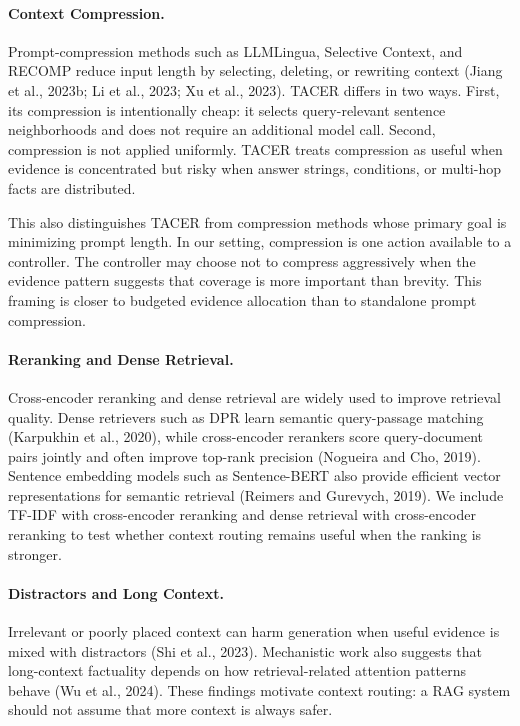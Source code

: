 \documentclass[11pt]{article}
\begin{document}
\paragraph{Context Compression.}
Prompt-compression methods such as LLMLingua, Selective Context, and RECOMP reduce input length by selecting, deleting, or rewriting context (Jiang et al., 2023b; Li et al., 2023; Xu et al., 2023). TACER differs in two ways. First, its compression is intentionally cheap: it selects query-relevant sentence neighborhoods and does not require an additional model call. Second, compression is not applied uniformly. TACER treats compression as useful when evidence is concentrated but risky when answer strings, conditions, or multi-hop facts are distributed.

This also distinguishes TACER from compression methods whose primary goal is minimizing prompt length. In our setting, compression is one action available to a controller. The controller may choose not to compress aggressively when the evidence pattern suggests that coverage is more important than brevity. This framing is closer to budgeted evidence allocation than to standalone prompt compression.

\paragraph{Reranking and Dense Retrieval.}
Cross-encoder reranking and dense retrieval are widely used to improve retrieval quality. Dense retrievers such as DPR learn semantic query-passage matching (Karpukhin et al., 2020), while cross-encoder rerankers score query-document pairs jointly and often improve top-rank precision (Nogueira and Cho, 2019). Sentence embedding models such as Sentence-BERT also provide efficient vector representations for semantic retrieval (Reimers and Gurevych, 2019). We include TF-IDF with cross-encoder reranking and dense retrieval with cross-encoder reranking to test whether context routing remains useful when the ranking is stronger.

\paragraph{Distractors and Long Context.}
Irrelevant or poorly placed context can harm generation when useful evidence is mixed with distractors (Shi et al., 2023). Mechanistic work also suggests that long-context factuality depends on how retrieval-related attention patterns behave (Wu et al., 2024). These findings motivate context routing: a RAG system should not assume that more context is always safer.
\end{document}
